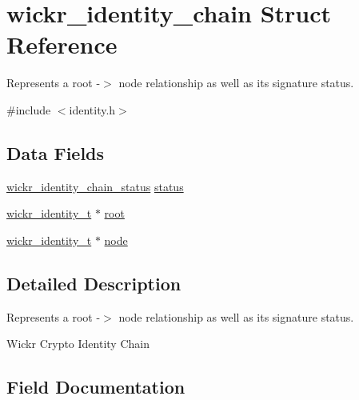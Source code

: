 \hypertarget{structwickr__identity__chain}{}\section{wickr\+\_\+identity\+\_\+chain Struct Reference}
\label{structwickr__identity__chain}


Represents a root -\/$>$ node relationship as well as it\textquotesingle{}s signature status.  




{\ttfamily \#include $<$identity.\+h$>$}

\subsection*{Data Fields}
\begin{DoxyCompactItemize}
\item 
\mbox{\hyperlink{group__wickr__identity_ga78aefa3835eb13ca75c0129583b5ebfa}{wickr\+\_\+identity\+\_\+chain\+\_\+status}} \mbox{\hyperlink{structwickr__identity__chain_acee365b411eb4a7e7c68c115d60e166e}{status}}
\item 
\mbox{\hyperlink{structwickr__identity}{wickr\+\_\+identity\+\_\+t}} $\ast$ \mbox{\hyperlink{structwickr__identity__chain_a0982b1510591138e2e7d0546741bc6e0}{root}}
\item 
\mbox{\hyperlink{structwickr__identity}{wickr\+\_\+identity\+\_\+t}} $\ast$ \mbox{\hyperlink{structwickr__identity__chain_a4343dae5f1c82057289c26e5c7bb1226}{node}}
\end{DoxyCompactItemize}


\subsection{Detailed Description}
Represents a root -\/$>$ node relationship as well as it\textquotesingle{}s signature status. 

Wickr Crypto Identity Chain 

\subsection{Field Documentation}
\mbox{\label{structwickr__identity__chain_a4343dae5f1c82057289c26e5c7bb1226}} 
